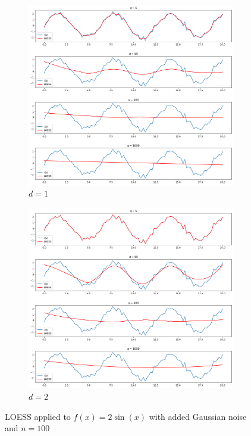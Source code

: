 \documentclass[main.tex]{subfiles}
\begin{document}
\begin{figure}
  \centering
  \begin{subfigure}[b]{0.49\textwidth}
    \centering
    \includegraphics[width=\textwidth]{imgs/loess1}
    \caption{$d=1$}
  \end{subfigure}
  \begin{subfigure}[b]{0.49\textwidth}
    \centering
    \includegraphics[width=\textwidth]{imgs/loess2}
    \caption{$d=2$}
  \end{subfigure}
  \caption{LOESS applied to $f(x) = 2\sin(x)$ with added Gaussian noise and $n = 100$}
  \label{fig_loess}
\end{figure}
\end{document}
